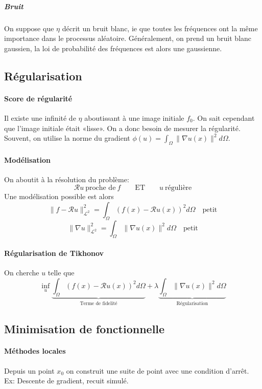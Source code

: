 \documentclass[french]{article}
\begin{document}
\subparagraph{Bruit} On suppose que $\eta$ décrit un bruit blanc, ie
que toutes les fréquences ont la même importance dans le processus aléatoire.
Généralement, on prend un bruit blanc gaussien, la loi de probabilité des
fréquences est alors une gaussienne.

\subsection{Régularisation}
\paragraph{Score de régularité} Il existe une infinité de $\eta$ aboutissant
à une image initiale $f_0$. On sait cependant que l'image initiale était
«lisse». On a donc besoin de mesurer la régularité. Souvent, on utilise la
norme du gradient $\phi (u) = \int_\Omega \|\nabla u(x) \|^2d\Omega$.

\paragraph{Modélisation} On aboutit à la résolution du problème:
$$\mathcal{R}u \ \text{proche de}\  f \qquad\text{ET}\qquad u\  \text{régulière}$$
Une modélisation possible est alors
$$ \|f - \mathcal{R}u\|^2_{\mathscr{L}^2} =
\int_\Omega \left( f(x) - \mathcal{R} u(x) \right)^2 d\Omega \quad\text{petit}$$
$$ \|\nabla u\|^2_{\mathscr{L}^2} =
\int_\Omega \|\nabla u(x) \|^2d\Omega \quad\text{petit}$$

\paragraph{Régularisation de Tikhonov} On cherche $u$ telle que
$$ \inf_u
\underbrace{\int_\Omega \left( f(x) - \mathcal{R} u(x) \right)^2 d\Omega}_{\text{Terme de fidelité}}
+ \lambda \underbrace{\int_\Omega \|\nabla u(x) \|^2d\Omega}_{\text{Régularisation}}$$

\subsection{Minimisation de fonctionnelle}

\paragraph{Méthodes locales} Depuis un point $x_0$ on construit une
suite de point avec une condition d'arrêt. Ex: Descente de gradient,
recuit simulé.
\end{document}
